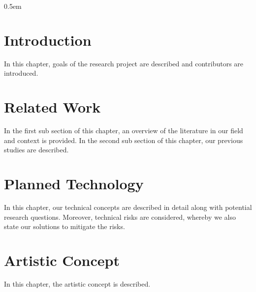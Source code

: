 \documentclass[11pt,a4paper,titlepage,final,table]{article}
\begin{document}
\maketitle
\clearpage
{}
\setcounter{page}{2}
\pagestyle{plain}
\parskip 0.5em





{}

\lstset{
	basicstyle=\ttfamily\small,
	keywordstyle=\bfseries,
	language=[Sharp]C
}



\section{Introduction}
In this chapter, goals of the research project are described and contributors are introduced.



\section{Related Work}
In the first sub section of this chapter, an overview of the literature in our field and context is provided.
In the second sub section of this chapter, our previous studies are described.



\section{Planned Technology}
In this chapter, our technical concepts are described in detail along with potential research questions.
Moreover, technical risks are considered, whereby we also state our solutions to mitigate the risks.





\section{Artistic Concept}
In this chapter, the artistic concept is described.


\end{document}
